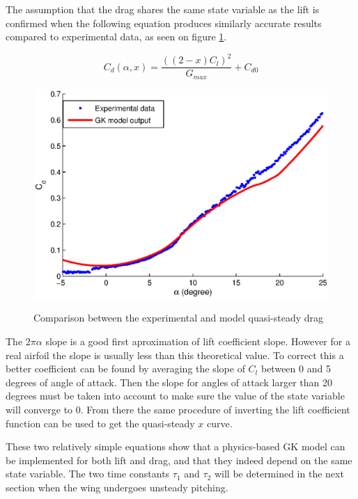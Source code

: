 \par The assumption that the drag shares the same state variable as the lift is confirmed when the following equation produces similarly accurate results compared to experimental data, as seen on figure \ref{fig:GK_Cd_vs_alpha}.

\begin{equation}
  C_d(\alpha,x)= \frac{ \left( \left( 2 - x \right)C_l \right)^2 }{G_{max}} + C_{d0}
  \label{eqn:Cd_function}
\end{equation}

\begin{figure}[h]
  \begin{center}
    \scalebox{1.0}
    {\includegraphics{./Figures/GK_cd_vs_alpha.eps}}
  \end{center}
  \caption{Comparison between the experimental and model quasi-steady drag}
  \label{fig:GK_Cd_vs_alpha}
\end{figure}

\par The $2\pi\alpha$ slope is a good first aproximation of lift coefficient slope.
However for a real airfoil the slope is usually less than this theoretical value.
To correct this a better coefficient can be found by averaging the slope of $C_l$ between 0 and 5 degrees of angle of attack.
Then the slope for angles of attack larger than 20 degrees must be taken into account to make sure the value of the state variable will converge to 0.
From there the same procedure of inverting the lift coefficient function can be used to get the quasi-steady $x$ curve.

\par These two relatively simple equations show that a physics-based GK model can be implemented for both lift and drag, and that they indeed depend on the same state variable.
The two time constants $\tau_1$ and $\tau_2$ will be determined in the next section when the wing undergoes unsteady pitching.

